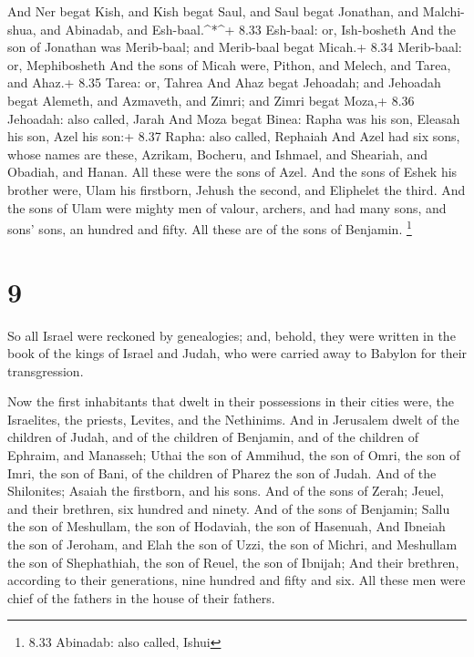  And Ner begat Kish, and Kish begat Saul, and Saul begat
Jonathan, and Malchi-shua, and Abinadab, and Esh-baal.\^{}*\^{}+ 8.33
Esh-baal: or, Ish-bosheth  And the son of Jonathan was
Merib-baal; and Merib-baal begat Micah.+ 8.34 Merib-baal: or,
Mephibosheth  And the sons of Micah were, Pithon, and
Melech, and Tarea, and Ahaz.+ 8.35 Tarea: or, Tahrea  And
Ahaz begat Jehoadah; and Jehoadah begat Alemeth, and Azmaveth, and
Zimri; and Zimri begat Moza,+ 8.36 Jehoadah: also called, Jarah
 And Moza begat Binea: Rapha was his son, Eleasah his son,
Azel his son:+ 8.37 Rapha: also called, Rephaiah  And Azel
had six sons, whose names are these, Azrikam, Bocheru, and Ishmael, and
Sheariah, and Obadiah, and Hanan. All these were the sons of Azel.
 And the sons of Eshek his brother were, Ulam his
firstborn, Jehush the second, and Eliphelet the third.  And
the sons of Ulam were mighty men of valour, archers, and had many sons,
and sons' sons, an hundred and fifty. All these are of the sons of
Benjamin. \footnote{8.33 Abinadab: also called, Ishui}

\hypertarget{section-8}{%
\section{9}\label{section-8}}

 So all Israel were reckoned by genealogies; and, behold,
they were written in the book of the kings of Israel and Judah, who were
carried away to Babylon for their transgression.

 Now the first inhabitants that dwelt in their possessions
in their cities were, the Israelites, the priests, Levites, and the
Nethinims.  And in Jerusalem dwelt of the children of Judah,
and of the children of Benjamin, and of the children of Ephraim, and
Manasseh;  Uthai the son of Ammihud, the son of Omri, the
son of Imri, the son of Bani, of the children of Pharez the son of
Judah.  And of the Shilonites; Asaiah the firstborn, and his
sons.  And of the sons of Zerah; Jeuel, and their brethren,
six hundred and ninety.  And of the sons of Benjamin; Sallu
the son of Meshullam, the son of Hodaviah, the son of Hasenuah,
 And Ibneiah the son of Jeroham, and Elah the son of Uzzi,
the son of Michri, and Meshullam the son of Shephathiah, the son of
Reuel, the son of Ibnijah;  And their brethren, according to
their generations, nine hundred and fifty and six. All these men were
chief of the fathers in the house of their fathers.

